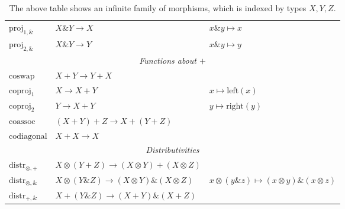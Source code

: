 \begin{table}[h!]
\begin{tabular}{lll}
        $\textrm{proj}_{1, \&}$ & $X \& Y \to X$ & $x \& y \mapsto x$ \\
        $\textrm{proj}_{2, \&}$ & $X \& Y \to Y$ & $x \& y \mapsto y$ \\
        \hline
        \multicolumn{3}{c}{\textit{Functions about \(+\)}} \\
        \hline
        $\textrm{coswap}$ & $X + Y \to Y + X$ & \\
        $\textrm{coproj}_1$ & $X \to X + Y$ & $x \mapsto \text{left}(x)$ \\
        $\textrm{coproj}_2$ & $Y \to X + Y$ & $y \mapsto \text{right}(y)$ \\
        $\textrm{coassoc}$ & $(X + Y) + Z \to X + (Y + Z)$ & \\
        $\textrm{codiagonal}$ & $X + X \to X$ &  \\
        \hline
        \multicolumn{3}{c}{\textit{Distributivities}} \\
        \hline
        $\textrm{distr}_{\otimes, +}$ & $X \otimes (Y + Z) \to (X \otimes Y) + (X \otimes Z)$ & \\
        $\textrm{distr}_{\otimes, \&}$ & $X \otimes (Y \& Z) \to (X \otimes Y) \& (X \otimes Z)$ & $x \otimes (y \& z) \mapsto (x \otimes y) \& (x \otimes z)$ \\
        $\textrm{distr}_{+, \&}$ & $X + (Y \& Z) \to (X + Y) \& (X + Z)$ &  \\
        \hline
    \end{tabular}
    \caption{The above table shows an infinite family of morphisms, which is indexed by types $X,Y,Z$.}
    \label{fig:prime-morphisms}
\end{table}

